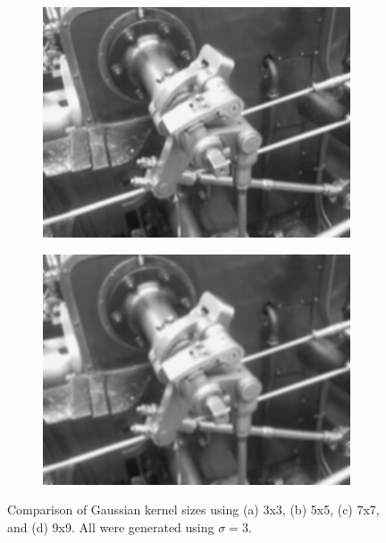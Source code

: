 \documentclass[12pt]{article}
\begin{document}
\begin{figure}[H]
\begin{subfigure}[b]{0.45\linewidth}
				\label{fig:gaussianCmp5x5}
			\end{subfigure} %
			\begin{subfigure}[b]{0.45\linewidth}
				\includegraphics[width=1\linewidth,keepaspectratio]{../examples/valve/valve_gaussian-7x7}
				\subcaption{}
				\label{fig:gaussianCmp7x7}
			\end{subfigure} %
			\begin{subfigure}[b]{0.45\linewidth}
				\includegraphics[width=1\linewidth,keepaspectratio]{../examples/valve/valve_gaussian-9x9}
				\subcaption{}
				\label{fig:gaussianCmp9x9}
			\end{subfigure} %
			\caption{\small Comparison of Gaussian kernel sizes using (a) 3x3, (b) 5x5, (c) 7x7, and (d) 9x9. All were generated using $\sigma = 3$.}
			\label{fig:gaussianCmp}
		\end{figure} %
\end{document}
